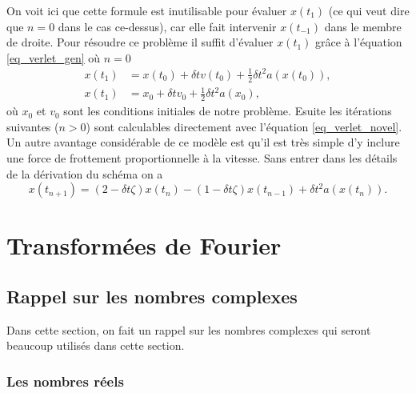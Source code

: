 \documentclass[a4paper,12pt]{book}
\begin{document}
On voit ici que cette formule est inutilisable pour évaluer $x(t_1)$ (ce qui veut dire que
$n=0$ dans le cas ce-dessus), car elle fait intervenir $x(t_{-1})$ dans le membre de droite.
Pour résoudre ce problème il suffit d'évaluer $x(t_1)$ grâce à l'équation
\eqref{eq_verlet_gen} où $n=0$
\begin{align}
 x(t_{1})&=x(t_0)+\delta t v(t_0)+\frac{1}{2}\delta t^2 a(x(t_0)),\nonumber\\
 x(t_{1})&=x_0+\delta t v_0+\frac{1}{2}\delta t^2 a(x_0),
\end{align}
où $x_0$ et $v_0$ sont les conditions initiales de notre problème.
Esuite les itérations suivantes ($n>0$) sont calculables directement 
avec l'équation \eqref{eq_verlet_novel}. Un autre avantage considérable
de ce modèle est qu'il est très simple d'y inclure une force de frottement
proportionnelle à la vitesse.
Sans entrer dans les détails de la dérivation du schéma on a
\begin{equation}
 x(t_{n+1})=(2-\delta t\zeta)x(t_n)-(1-\delta t\zeta)x(t_{n-1})+\delta t^2 a(x(t_n)).
\end{equation}




\chapter{Transformées de Fourier}

\section{Rappel sur les nombres complexes}

Dans cette section, on fait un rappel sur les nombres complexes qui seront beaucoup utilisés dans cette section.

\subsection{Les nombres réels}
\end{document}
